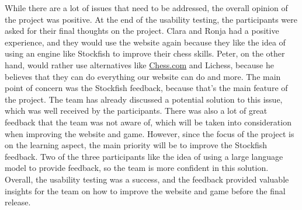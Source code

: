 While there are a lot of issues that need to be addressed, the overall opinion of the project was positive.
At the end of the usability testing, the participants were asked for their final thoughts on the project.
Clara and Ronja had a positive experience, and they would use the website again because they like the idea of using an
engine like Stockfish to improve their chess skills.
Peter, on the other hand, would rather use alternatives like \url{Chess.com} and Lichess, because he believes that they
can do everything our website can do and more.
The main point of concern was the Stockfish feedback, because that's the main feature of the project.
The team has already discussed a potential solution to this issue, which was well received by the participants.
There was also a lot of great feedback that the team was not aware of, which will be taken into consideration when
improving the website and game.
However, since the focus of the project is on the learning aspect, the main priority will be to improve the Stockfish
feedback.
Two of the three participants like the idea of using a large language model to provide feedback, so the team is more
confident in this solution.
Overall, the usability testing was a success, and the feedback provided valuable insights for the team on how to improve
the website and game before the final release.
